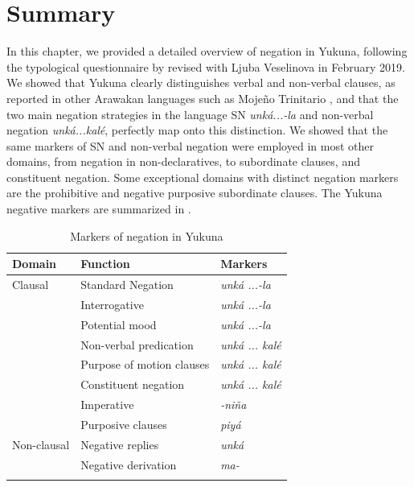 \documentclass[output=paper,colorlinks,citecolor=brown]{langscibook}
\begin{document}
\section{Summary}
In this chapter, we provided a detailed overview of negation in Yukuna, following the typological questionnaire by  revised with Ljuba Veselinova in February 2019. We showed that Yukuna clearly distinguishes verbal and non-verbal clauses, as reported in other Arawakan languages such as Mojeño Trinitario \citep{Rose2018}, and that the two main negation strategies in the language SN \textit{unká{...}-la} and non-verbal negation \textit{unká{...}kalé}, perfectly map onto this distinction.
We showed that the same markers of SN and non-verbal negation were employed in most other domains, from negation in non-declaratives, to subordinate clauses, and constituent negation. Some exceptional domains with distinct negation markers are the prohibitive and negative purposive subordinate clauses. The Yukuna negative markers are summarized in .

\begin{table}									
\caption{Markers of negation in Yukuna}	\label{yukuna:tab:summary}									
\begin{tabular}{lll} 									
\lsptoprule									
Domain	&	Function	&		Markers		\\
\midrule									
Clausal	&	Standard Negation	&	\textit{unká ...-la} \\
	&	Interrogative 	&	\textit{unká ...-la} \\
	&	Potential mood	&	\textit{unká ...-la} \\
	&	Non-verbal predication	&	\textit{unká ... kalé} \\
	&	Purpose of motion clauses	&	\textit{unká ... kalé} \\
	&	Constituent negation	&	\textit{unká ... kalé} \\
	&	Imperative	&	\textit{-niña}		\\
	&	Purposive clauses	&	\textit{piyá} \\
Non-clausal	&	Negative replies	&	\textit{unká} \\
	&	Negative derivation	&	\textit{ma-} \\
\lspbottomrule									
\end{tabular}									
\end{table}			
\end{document}
